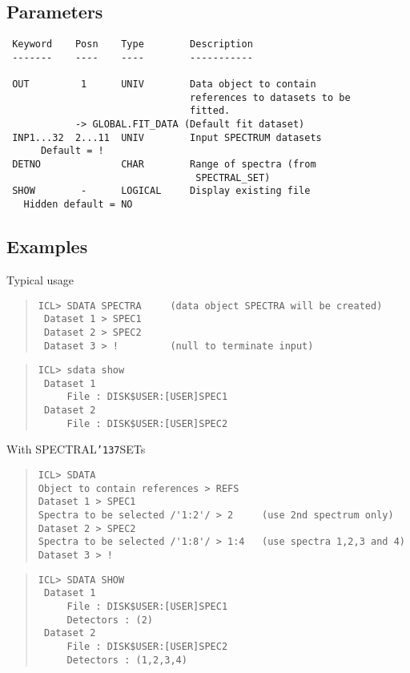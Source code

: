 \documentclass{book}
\renewcommand{\_}{{\tt\char'137}}     %
\begin{document}
\subsection{Parameters}
\begin{verbatim}
 Keyword    Posn    Type        Description
 -------    ----    ----        -----------

 OUT         1      UNIV        Data object to contain
                                references to datasets to be
                                fitted.
            -> GLOBAL.FIT_DATA (Default fit dataset)
 INP1...32  2...11  UNIV        Input SPECTRUM datasets
      Default = !
 DETNO              CHAR        Range of spectra (from
                                 SPECTRAL_SET)
 SHOW        -      LOGICAL     Display existing file
   Hidden default = NO

\end{verbatim}\subsection{Examples}
Typical usage
\begin{quote}\begin{verbatim}
ICL> SDATA SPECTRA     (data object SPECTRA will be created)
 Dataset 1 > SPEC1
 Dataset 2 > SPEC2
 Dataset 3 > !         (null to terminate input)
\end{verbatim}\end{quote}
\begin{quote}\begin{verbatim}
ICL> sdata show
 Dataset 1
     File : DISK$USER:[USER]SPEC1
 Dataset 2
     File : DISK$USER:[USER]SPEC2
\end{verbatim}\end{quote}
With SPECTRAL\_SETs
\begin{quote}\begin{verbatim}
ICL> SDATA
Object to contain references > REFS
Dataset 1 > SPEC1
Spectra to be selected /'1:2'/ > 2     (use 2nd spectrum only)
Dataset 2 > SPEC2
Spectra to be selected /'1:8'/ > 1:4   (use spectra 1,2,3 and 4)
Dataset 3 > !
\end{verbatim}\end{quote}
\begin{quote}\begin{verbatim}
ICL> SDATA SHOW
 Dataset 1
     File : DISK$USER:[USER]SPEC1
     Detectors : (2)
 Dataset 2
     File : DISK$USER:[USER]SPEC2
     Detectors : (1,2,3,4)
\end{verbatim}\end{quote}
\end{document}
